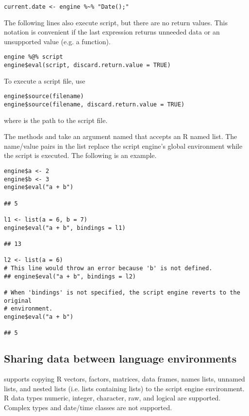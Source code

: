 \begin{verbatim}
current.date <- engine %~% "Date();"
\end{verbatim}

The following lines also execute script, but there are no return values. This notation is convenient if the last expression returns unneeded data or an unsupported value (e.g. a function).

\begin{verbatim}
engine %@% script
engine$eval(script, discard.return.value = TRUE)
\end{verbatim}

To execute a script file, use 

\begin{verbatim}
engine$source(filename)
engine$source(filename, discard.return.value = TRUE)
\end{verbatim}

\noindent where  is the path to the script file.

The methods  and  take an argument named  that accepts an R named list. The name/value pairs in the list replace the script engine's global environment while the script is executed. The following is an example.

\begin{verbatim}
engine$a <- 2
engine$b <- 3
engine$eval("a + b")

## 5

l1 <- list(a = 6, b = 7)
engine$eval("a + b", bindings = l1)

## 13

l2 <- list(a = 6)
# This line would throw an error because 'b' is not defined.
## engine$eval("a + b", bindings = l2)

# When 'bindings' is not specified, the script engine reverts to the original
# environment.
engine$eval("a + b")

## 5
\end{verbatim}

\subsection{Sharing data between language environments}

 supports copying R vectors, factors, matrices, data frames, names lists, unnamed lists, and nested lists (i.e. lists containing lists) to the script engine environment. R data types numeric, integer, character, raw, and logical are supported. Complex types and date/time classes are not supported.

